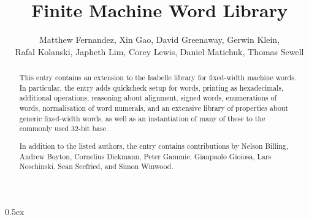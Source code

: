 \documentclass[11pt,a4paper]{article}
\begin{document}
\title{Finite Machine Word Library}
\author{Matthew Fernandez, Xin Gao, David Greenaway, Gerwin Klein,\\
       Rafal Kolanski, Japheth Lim, Corey Lewis, Daniel Matichuk, Thomas Sewell}
\maketitle

\begin{abstract}  
  This entry contains an extension to the Isabelle library for fixed-width
  machine words. In particular, the entry adds quickcheck setup for words,
  printing as hexadecimals, additional operations, reasoning about alignment,
  signed words, enumerations of words, normalisation of word numerals, and an
  extensive library of properties about generic fixed-width words, as well as
  an instantiation of many of these to the commonly used 32-bit base.
  
  In addition to the listed authors, the entry contains contributions by
  Nelson Billing, Andrew Boyton, Cornelius Diekmann, Peter Gammie, Gianpaolo
  Gioiosa, Lars Noschinski, Sean Seefried, and Simon Winwood.
\end{abstract}

\tableofcontents

\parindent 0pt\parskip 0.5ex


\end{document}
